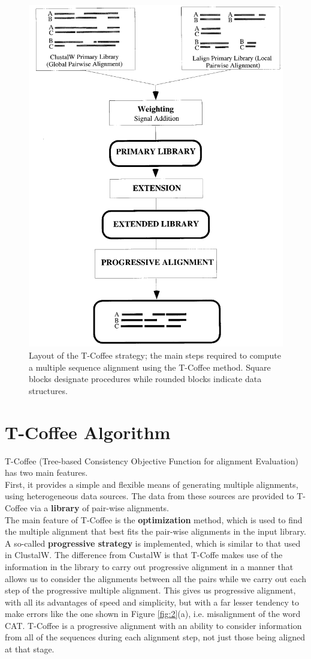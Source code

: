 \begin{figure}[H]
\centering
\includegraphics[width=0.5\linewidth]{1.png}
\caption{Layout of the T-Coffee strategy; the main steps required to compute a multiple sequence alignment using the T-Coffee method. Square blocks designate procedures while rounded blocks indicate data structures.}
\label{fig:structure}
\end{figure}

\section{T-Coffee Algorithm}
T-Coffee (Tree-based Consistency Objective Function for alignment Evaluation) has two main features.
\\
First, it provides a simple and flexible means of generating multiple alignments, using heterogeneous data sources. The data from these sources are provided to T-Coffee via a \textbf{library} of pair-wise alignments.
\\
The main feature of T-Coffee is the \textbf{optimization} method, which is used to find the multiple alignment that best fits the pair-wise alignments in the input library.
A so-called \textbf{progressive strategy} is implemented, which is similar to that used in ClustalW. The difference from CustalW is that T-Coffe makes use of the information in the library to carry out progressive alignment in a manner that allows us to consider the alignments between all the pairs while we carry out each step of the progressive multiple alignment.
This gives us progressive alignment, with all its advantages of speed and simplicity, but with a far lesser tendency to make errors like the one shown in Figure \ref{fig:2}(a), i.e. misalignment of the word CAT.
T-Coffee is a progressive alignment with an ability to consider information from all of the sequences during each alignment step, not just those being aligned at that stage.

